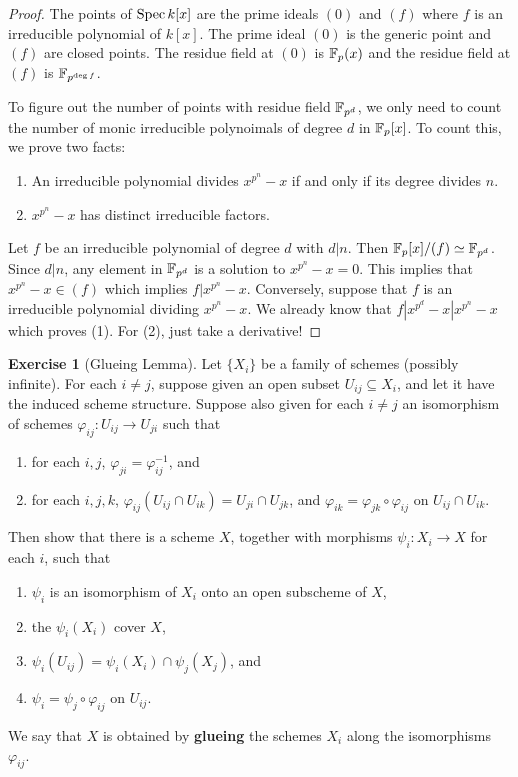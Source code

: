 \documentclass[]{pcmi}
\theoremstyle{plain}
\theoremstyle{definition}
\newtheorem{Exercise}{Exercise}
\theoremstyle{remark}
\begin{document}
\begin{proof}
    The points of $\operatorname{Spec} k[x]$ are the prime ideals $(0)$ and $(f)$ where $f$ is an irreducible polynomial of $k[x]$. The prime ideal $(0)$ is the generic point and $(f)$ are closed points. The residue field at $(0)$ is $\mathbb{F}_p(x)$ and the residue field at $(f)$ is $\mathbb{F}_{p^{\deg f}}$. 
    
    To figure out the number of points with residue field $\mathbb{F}_{p^d}$, we only need to count the number of monic irreducible polynoimals of degree $d$ in $\mathbb{F}_p[x]$. To count this, we prove two facts:
    \begin{enumerate}
        \item An irreducible polynomial divides $x^{p^n} - x$ if and only if its degree divides $n$. 
        \item $x^{p^n} - x$ has distinct irreducible factors.
    \end{enumerate}
    Let $f$ be an irreducible polynomial of degree $d$ with $d | n$. Then $\mathbb{F}_p[x] / (f) \simeq \mathbb{F}_{p^d}$. Since $d | n$, any element in $\mathbb{F}_{p^d}$ is a solution to $x^{p^n} - x = 0$. This implies that $x^{p^n} - x \in (f)$ which implies $f | x^{p^n} - x$. Conversely, suppose that $f$ is an irreducible polynomial dividing $x^{p^n} - x$. We already know that $f | x^{p^d} - x | x^{p^n} - x$ which proves (1). For (2), just take a derivative!
\end{proof}

\begin{Exercise}[Glueing Lemma]
    Let $\{X_i\}$ be a family of schemes (possibly infinite). For each $i \neq j$, suppose given an open subset $U_{ij} \subseteq X_i$, and let it have the induced scheme structure. Suppose also given for each $i \neq j$ an isomorphism of schemes $\varphi_{ij} : U_{ij} \to U_{ji}$ such that 
    \begin{enumerate}
        \item for each $i, j$, $\varphi_{ji} = \varphi_{ij}^{-1}$, and 
        \item for each $i, j, k$, $\varphi_{ij}(U_{ij} \cap U_{ik}) = U_{ji} \cap U_{jk}$, and $\varphi_{ik} = \varphi_{jk} \circ \varphi_{ij}$ on $U_{ij} \cap U_{ik}$.
    \end{enumerate}
    Then show that there is a scheme $X$, together with morphisms $\psi_i : X_i \to X$ for each $i$, such that 
    \begin{enumerate}
        \item $\psi_i$ is an isomorphism of $X_i$ onto an open subscheme of $X$, 
        \item the $\psi_i(X_i)$ cover $X$, 
        \item $\psi_i(U_{ij}) = \psi_i(X_i) \cap \psi_j(X_j)$, and 
        \item $\psi_i = \psi_j \circ \varphi_{ij}$ on $U_{ij}$. 
    \end{enumerate}
    We say that $X$ is obtained by \textbf{glueing} the schemes $X_i$ along the isomorphisms $\varphi_{ij}$.
\end{Exercise}
\end{document}
